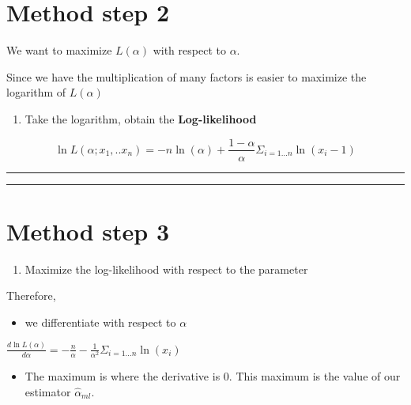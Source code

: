\documentclass[
]{book}
\providecommand{\tightlist}{%
  \setlength{\itemsep}{0pt}\setlength{\parskip}{0pt}}
\begin{document}
\hypertarget{method-step-2}{%
\section{Method step 2}\label{method-step-2}}

We want to maximize \(L(\alpha)\) with respect to \(\alpha\).

Since we have the multiplication of many factors is easier to maximize the logarithm of \(L(\alpha)\)

\begin{enumerate}
\def\labelenumi{\arabic{enumi}.}
\setcounter{enumi}{1}
\tightlist
\item
  Take the logarithm, obtain the \textbf{Log-likelihood}
\end{enumerate}

\[\ln L(\alpha;x_1,..x_n)= -n \ln(\alpha) + {\frac{1-\alpha}{\alpha}} \Sigma_{i=1...n} \ln (x_i-1)\]

\begin{center}\rule{0.5\linewidth}{0.5pt}\end{center}

\begin{center}\rule{0.5\linewidth}{0.5pt}\end{center}

\hypertarget{method-step-3}{%
\section{Method step 3}\label{method-step-3}}

\begin{enumerate}
\def\labelenumi{\arabic{enumi}.}
\setcounter{enumi}{2}
\tightlist
\item
  Maximize the log-likelihood with respect to the parameter
\end{enumerate}

Therefore,

\begin{itemize}
\tightlist
\item
  we differentiate with respect to \(\alpha\)
\end{itemize}

\(\frac{d \ln L(\alpha)}{d \alpha}= -\frac{n}{\alpha} - \frac{1}{\alpha^2} \Sigma_{i=1...n} \ln (x_i)\)

\begin{itemize}
\tightlist
\item
  The maximum is where the derivative is \(0\). This maximum is the value of our estimator \(\hat{\alpha}_{ml}\).
\end{itemize}
\end{document}
